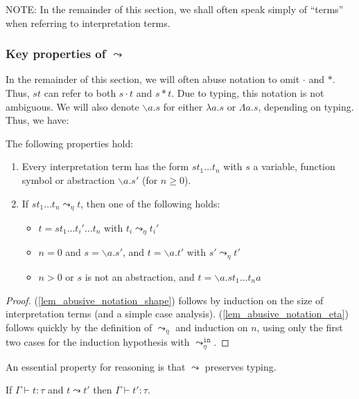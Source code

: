 \documentclass[runningheads,a4paper]{llncs}
\newcommand{\arreta}{\leadsto_\eta}
\newcommand{\arretain}{\leadsto_\eta^{\mathtt{in}}}
\newcommand{\arrnormalise}{\leadsto}
\newcommand{\abs}[2]{\lambda #1.#2}
\newcommand{\tabs}[2]{\Lambda #1.#2}
\newcommand{\abstraction}[2]{\backslash #1.#2}
\newcommand{\app}[2]{#1 \cdot #2}
\newcommand{\tapp}[2]{#1 * #2}
\begin{document}
NOTE: In the remainder of this section, we shall often speak simply of
``terms'' when referring to interpretation terms.

\subsubsection{Key properties of $\arrnormalise$}

In the remainder of this section, we will often abuse notation to omit
$\cdot$ and $*$.  Thus, $s t$ can refer to both $\app{s}{t}$ and
$\tapp{s}{t}$.  Due to typing, this notation is not ambiguous.
We will also denote $\abstraction{a}{s}$ for either $\abs{a}{s}$ or
$\tabs{a}{s}$, depending on typing.  Thus, we have:

\begin{lemma}\label{lem_abusive_notation}
The following properties hold:
\begin{enumerate}
\item\label{lem_abusive_notation_shape}
  Every interpretation term has the form $s t_1 \dots t_n$ with
  $s$ a variable, function symbol or abstraction $\abstraction{a}{s'}$
  (for $n \geq 0$).
\item\label{lem_abusive_notation_eta}
  If $s t_1 \dots t_n \arreta t$, then one of the following holds:
  \begin{itemize}
  \item $t = s t_1 \dots t_i' \dots t_n$ with $t_i \arreta t_i'$
  \item $n = 0$ and $s = \abstraction{a}{s'}$, and $t = \abstraction{a
    }{t'}$ with $s' \arreta t'$
  \item $n > 0$ or $s$ is not an abstraction, and $t =
    \abstraction{a}{s t_1 \dots t_n a}$
  \end{itemize}
\end{enumerate}
\end{lemma}

\begin{proof}
(\ref{lem_abusive_notation_shape}) follows by induction on the size of
interpretation terms (and a simple case analysis).
(\ref{lem_abusive_notation_eta}) follows quickly by the definition of
$\arreta$ and induction on $n$, using only the first two cases for the
induction hypothesis with $\arretain$.
\end{proof}

An essential property for reasoning is that $\arrnormalise$ preserves
typing.

\begin{lemma}
  If $\Gamma \vdash t : \tau$ and $t \arrnormalise t'$ then
  $\Gamma \vdash t' : \tau$.
\end{lemma}
\end{document}
